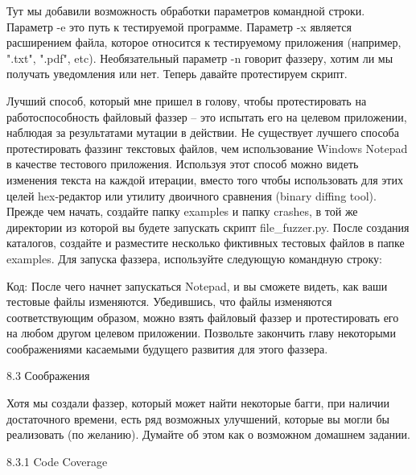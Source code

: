 \documentclass[12pt, a4paper, oneside]{book}
\begin{document}

Тут мы добавили возможность обработки параметров командной строки. Параметр -e это путь к тестируемой программе. Параметр -x является расширением файла, которое относится к тестируемому приложения (например, ".txt", ".pdf", etc). Необязательный параметр -n говорит фаззеру, хотим ли мы получать уведомления или нет. Теперь давайте протестируем скрипт.

Лучший способ, который мне пришел в голову, чтобы протестировать на работоспособность файловый фаззер – это испытать его на целевом приложении, наблюдая за результатами мутации в действии. Не существует лучшего способа протестировать фаззинг текстовых файлов, чем использование Windows Notepad в качестве тестового приложения. Используя этот способ можно видеть изменения текста на каждой итерации, вместо того чтобы использовать для этих целей hex-редактор или утилиту двоичного сравнения (binary diffing tool). Прежде чем начать, создайте папку examples и папку crashes, в той же директории из которой вы будете запускать скрипт file\_fuzzer.py. После создания каталогов, создайте и разместите несколько фиктивных тестовых файлов в папке examples. Для запуска фаззера, используйте следующую командную строку:

Код:
После чего начнет запускаться Notepad, и вы сможете видеть, как ваши тестовые файлы изменяются. Убедившись, что файлы изменяются соответствующим образом, можно взять файловый фаззер и протестировать его на любом другом целевом приложении. Позвольте закончить главу некоторыми соображениями касаемыми будущего развития для этого фаззера.


8.3 Соображения

Хотя мы создали фаззер, который может найти некоторые багги, при наличии достаточного времени, есть ряд возможных улучшений, которые вы могли бы реализовать (по желанию). Думайте об этом как о возможном домашнем задании.

8.3.1 Code Coverage
\end{document}
